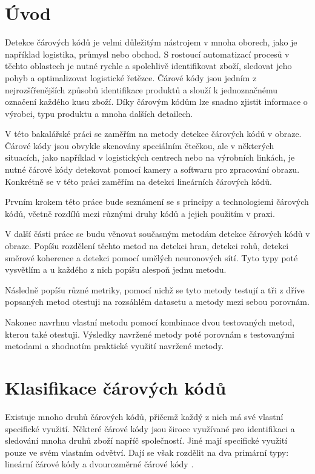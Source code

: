 
%

\chapter{Úvod}  Detekce čárových kódů je velmi důležitým nástrojem v mnoha oborech, jako je například logistika, průmysl nebo obchod. S rostoucí automatizací procesů v těchto oblastech je nutné rychle a spolehlivě identifikovat zboží, sledovat jeho pohyb a optimalizovat logistické řetězce. Čárové kódy jsou jedním z nejrozšířenějších způsobů identifikace produktů a slouží k jednoznačnému označení každého kusu zboží. Díky čárovým kódům lze snadno zjistit informace o výrobci, typu produktu a mnoha dalších detailech.

V této bakalářské práci se zaměřím na metody detekce čárových kódů v obraze. Čárové kódy jsou obvykle skenovány speciálním čtečkou, ale v některých situacích, jako například v logistických centrech nebo na výrobních linkách, je nutné čárové kódy detekovat pomocí kamery a softwaru pro zpracování obrazu. Konkrétně se v této práci zaměřím na detekci lineárních čárových kódů.

Prvním krokem této práce bude seznámení se s principy a technologiemi čárových kódů, včetně rozdílů mezi různými druhy kódů a jejich použitím v praxi.

V další části práce se budu věnovat současným metodám detekce čárových kódů v obraze. Popíšu rozdělení těchto metod na detekci hran, detekci rohů, detekci směrové koherence a detekci pomocí umělých neuronových sítí. Tyto typy poté vysvětlím a u každého z nich popíšu alespoň jednu metodu.

Následně popíšu různé metriky, pomocí nichž se tyto metody testují a tři z dříve popsaných metod otestuji na rozsáhlém datasetu a metody mezi sebou porovnám.

Nakonec navrhnu vlastní metodu pomocí kombinace dvou testovaných metod, kterou také otestuji. Výsledky navržené metody poté porovnám s testovanými metodami a zhodnotím praktické využití navržené metody.


\chapter{Klasifikace čárových kódů}
\label{barcode_classification}
Existuje mnoho druhů čárových kódů, přičemž každý z nich má své vlastní specifické využití. Některé čárové kódy jsou široce využívané pro identifikaci a sledování mnoha druhů zboží napříč společností. Jiné mají specifické využití pouze ve svém vlastním odvětví. Dají se však rozdělit na dva primární typy: lineární čárové kódy a dvourozměrné čárové kódy \cite{barcode1}.
